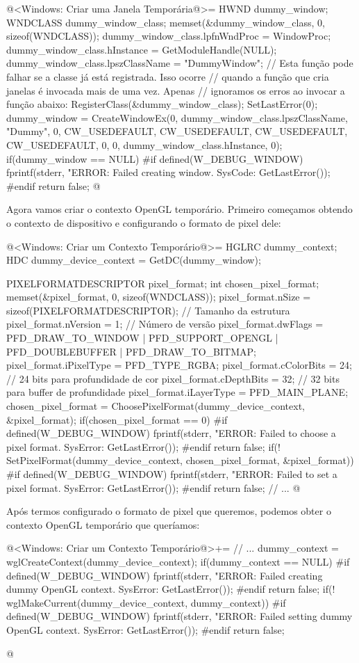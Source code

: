 \iniciocodigo
@<Windows: Criar uma Janela Temporária@>=
HWND dummy_window;
{
  WNDCLASS dummy_window_class;
  memset(&dummy_window_class, 0, sizeof(WNDCLASS));
  dummy_window_class.lpfnWndProc = WindowProc;
  dummy_window_class.hInstance = GetModuleHandle(NULL);
  dummy_window_class.lpszClassName = "DummyWindow";
  // Esta função pode falhar se a classe já está registrada. Isso ocorre
  // quando a função que cria janelas é invocada mais de uma vez. Apenas
  // ignoramos os erros ao invocar a função abaixo:
  RegisterClass(&dummy_window_class);
  SetLastError(0);
  dummy_window = CreateWindowEx(0, dummy_window_class.lpszClassName, "Dummy",
                                0, CW_USEDEFAULT, CW_USEDEFAULT, CW_USEDEFAULT,
                                CW_USEDEFAULT, 0, 0,
                                dummy_window_class.hInstance, 0);
  if(dummy_window == NULL){
#if defined(W_DEBUG_WINDOW)
    fprintf(stderr, "ERROR: Failed creating window. SysCode: %
            GetLastError());
#endif
    return false;
  }
}
@
\fimcodigo

Agora vamos criar o contexto OpenGL temporário. Primeiro começamos
obtendo o contexto de dispositivo e configurando o formato de pixel
dele:

\iniciocodigo
@<Windows: Criar um Contexto Temporário@>=
HGLRC dummy_context;
HDC dummy_device_context = GetDC(dummy_window);
{
  PIXELFORMATDESCRIPTOR pixel_format;
  int chosen_pixel_format;
  memset(&pixel_format, 0, sizeof(WNDCLASS));
  pixel_format.nSize = sizeof(PIXELFORMATDESCRIPTOR); // Tamanho da estrutura
  pixel_format.nVersion = 1; // Número de versão
  pixel_format.dwFlags = PFD_DRAW_TO_WINDOW | PFD_SUPPORT_OPENGL |
                         PFD_DOUBLEBUFFER | PFD_DRAW_TO_BITMAP;
  pixel_format.iPixelType = PFD_TYPE_RGBA;
  pixel_format.cColorBits = 24; // 24 bits para profundidade de cor
  pixel_format.cDepthBits = 32; // 32 bits para buffer de profundidade
  pixel_format.iLayerType = PFD_MAIN_PLANE;
  chosen_pixel_format = ChoosePixelFormat(dummy_device_context, &pixel_format);
  if(chosen_pixel_format == 0){
#if defined(W_DEBUG_WINDOW)
    fprintf(stderr, "ERROR: Failed to choose a pixel format. SysError: %
            GetLastError());
#endif
    return false;
  }
  if(! SetPixelFormat(dummy_device_context, chosen_pixel_format, &pixel_format)){
#if defined(W_DEBUG_WINDOW)
    fprintf(stderr, "ERROR: Failed to set a pixel format. SysError: %
            GetLastError());
#endif
    return false;
  }
  // ...
@
\fimcodigo

Após termos configurado o formato de pixel que queremos, podemos obter
o contexto OpenGL temporário que queríamos:

\iniciocodigo
@<Windows: Criar um Contexto Temporário@>+=
  // ...
  dummy_context = wglCreateContext(dummy_device_context);
  if(dummy_context == NULL){
#if defined(W_DEBUG_WINDOW)
    fprintf(stderr, "ERROR: Failed creating dummy OpenGL context. SysError: %
            GetLastError());
#endif
    return false;
  }
  if(! wglMakeCurrent(dummy_device_context, dummy_context)){
#if defined(W_DEBUG_WINDOW)
    fprintf(stderr, "ERROR: Failed setting dummy OpenGL context. SysError: %
            GetLastError());
#endif
    return false;
  }
}
@
\fimcodigo

